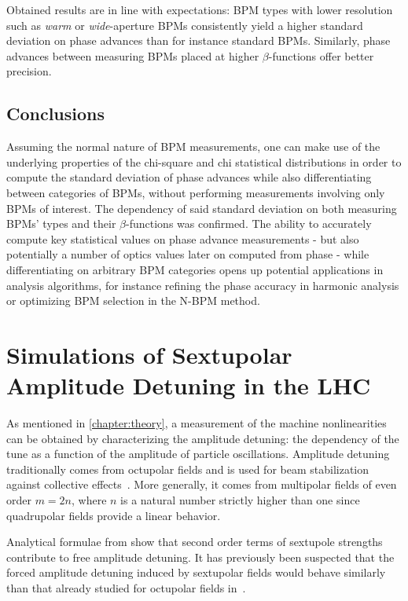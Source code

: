 Obtained results are in line with expectations: BPM types with lower resolution such as \textit{warm} or \textit{wide}-aperture BPMs consistently yield a higher standard deviation on phase advances than for instance standard BPMs.
Similarly, phase advances between measuring BPMs placed at higher \(\beta\)-functions offer better precision.

\subsection*{Conclusions}

Assuming the normal nature of BPM measurements, one can make use of the underlying properties of the chi-square and chi statistical distributions in order to compute the standard deviation of phase advances while also differentiating between categories of BPMs, without performing measurements involving only BPMs of interest.
The dependency of said standard deviation on both measuring BPMs' types and their \(\beta\)-functions was confirmed.
The ability to accurately compute key statistical values on phase advance measurements - but also potentially a number of optics values later on computed from phase - while differentiating on arbitrary BPM categories opens up potential applications in analysis algorithms, for instance refining the phase accuracy in harmonic analysis or optimizing BPM selection in the N-BPM method.

\section{Simulations of Sextupolar Amplitude Detuning in the LHC}
\label{section:sextupolar_amplitude_detuning}


As mentioned in \cref{chapter:theory}, a measurement of the machine nonlinearities can be obtained by characterizing the amplitude detuning: the dependency of the tune as a function of the amplitude of particle oscillations.
Amplitude detuning traditionally comes from octupolar fields and is used for beam stabilization against collective effects~\cite{BOOK:Chao:Collective_instabilities,PRAB:Karpov:Thresholds_Loss_Landau_Damping}.
More generally, it comes from multipolar fields of even order \(m = 2n\), where \(n\) is a natural number strictly higher than one since quadrupolar fields provide a linear behavior.

Analytical formulae from \cite{REPORT:Bengtsson:Smear_Tune_Shift, BOOK:Lee:Accelerator_physics,BOOK:Chao:Handbook_Accelerator_Physics_Engineering} show that second order terms of sextupole strengths contribute to free amplitude detuning.
It has previously been suspected that the forced amplitude detuning induced by sextupolar fields would behave similarly than that already studied for octupolar fields in~\cite{PRAB:White:Direct_Amplitude_Detuning_AC_Dipole}.

